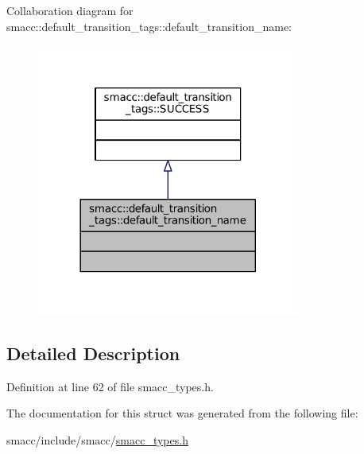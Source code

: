 Collaboration diagram for smacc\+:\+:default\+\_\+transition\+\_\+tags\+:\+:default\+\_\+transition\+\_\+name\+:
\nopagebreak
\begin{figure}[H]
\begin{center}
\leavevmode
\includegraphics[width=245pt]{structsmacc_1_1default__transition__tags_1_1default__transition__name__coll__graph}
\end{center}
\end{figure}


\subsection{Detailed Description}


Definition at line 62 of file smacc\+\_\+types.\+h.



The documentation for this struct was generated from the following file\+:\begin{DoxyCompactItemize}
\item 
smacc/include/smacc/\hyperlink{smacc__types_8h}{smacc\+\_\+types.\+h}\end{DoxyCompactItemize}
